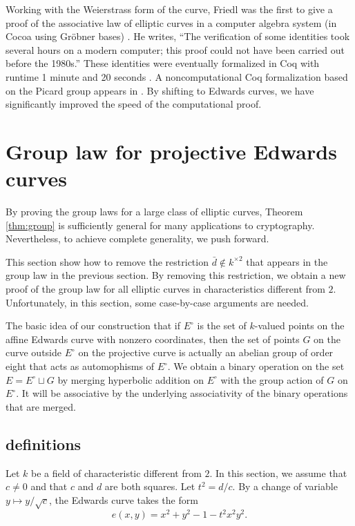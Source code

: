 \documentclass[12pt]{article}
\newcommand{\Eoo}{E^{\circ}}
\begin{document}
Working with the Weierstrass form of the curve, Friedl was the first
to give a proof of the associative law of elliptic curves in a
computer algebra system (in Cocoa using Gr\"obner bases)
\cite{friedl}.  He writes, ``The verification of some identities took
several hours on a modern computer; this proof could not have been
carried out before the 1980s.''  These identities were eventually
formalized in Coq with runtime 1 minute and 20 seconds
\cite{thery2007proving}.  A noncomputational Coq
formalization based on the Picard group appears in
\cite{bartzia2014formal}.  By shifting to Edwards curves, we have
significantly improved the speed of the computational proof.

\section{Group law for projective Edwards curves}

By proving the group laws for a large class of elliptic curves,
Theorem \ref{thm:group} is sufficiently general for many applications
to cryptography.  Nevertheless, to achieve complete generality, we
push forward.

This section show how to remove the restriction $\bar d\not\in
k^{\times 2}$ that appears in the group law in the previous section.
By removing this restriction, we obtain a new proof of the group law
for all elliptic curves in characteristics different from $2$.
Unfortunately, in this section, some case-by-case arguments are
needed.

The basic idea of our construction that if $\Eoo$ is the set of
$k$-valued points on the affine Edwards curve with nonzero
coordinates, then the set of points $G$ on the curve outside $\Eoo$ on
the projective curve is actually an abelian group of order eight that
acts as automophisms of $\Eoo$.  We obtain a binary operation on the
set $E=\Eoo\sqcup G$ by merging hyperbolic addition on $\Eoo$ with the
group action of $G$ on $\Eoo$.  It will be associative by the
underlying associativity of the binary operations that are merged.

\subsection{definitions}

Let $k$ be a field of characteristic different from $2$.  In this
section, we assume that $c\ne 0$ and that $c$ and $d$ are both
squares.  Let $t^2 = d/c$.  By a change of variable $y\mapsto
y/\sqrt{c}$, the Edwards curve takes the form
\begin{equation}\label{eqn:t}
e(x,y)= x^2 + y^2 -1 - t^2 x^2 y^2.
\end{equation}
\end{document}
